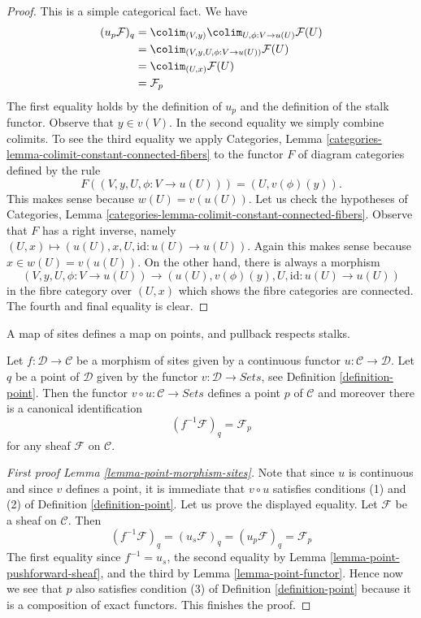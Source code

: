 \begin{proof}
This is a simple categorical fact. We have
\begin{align*}
(u_p\mathcal{F})_q
& =
\colim_{(V, y)} \colim_{U, \phi : V \to u(U)} \mathcal{F}(U) \\
& = \colim_{(V, y, U, \phi : V \to u(U))} \mathcal{F}(U) \\
& = \colim_{(U, x)} \mathcal{F}(U) \\
& = \mathcal{F}_p
\end{align*}
The first equality holds by the definition of $u_p$ and the
definition of the stalk functor. Observe that $y \in v(V)$.
In the second equality we simply combine colimits.
To see the third equality we apply
Categories, Lemma \ref{categories-lemma-colimit-constant-connected-fibers}
to the functor $F$ of diagram categories defined by the rule
$$
F((V, y, U, \phi : V \to u(U))) = (U, v(\phi)(y)).
$$
This makes sense because $w(U) = v(u(U))$. Let us check the hypotheses of
Categories, Lemma \ref{categories-lemma-colimit-constant-connected-fibers}.
Observe that $F$ has a right inverse, namely
$(U, x) \mapsto (u(U), x, U, \text{id} : u(U) \to u(U))$.
Again this makes sense because $x \in w(U) = v(u(U))$. On the other hand,
there is always a morphism
$$
(V, y, U, \phi : V \to u(U))
\longrightarrow
(u(U), v(\phi)(y), U, \text{id} : u(U) \to u(U))
$$
in the fibre category over $(U, x)$ which shows the fibre categories
are connected. The fourth and final equality is clear.
\end{proof}

\begin{lemma}
\label{lemma-point-morphism-sites}
\begin{slogan}
A map of sites defines a map on points, and pullback respects stalks.
\end{slogan}
Let $f : \mathcal{D} \to \mathcal{C}$ be a morphism of sites
given by a continuous functor $u : \mathcal{C} \to \mathcal{D}$.
Let $q$ be a point of $\mathcal{D}$ given by the functor
$v : \mathcal{D} \to \textit{Sets}$, see
Definition \ref{definition-point}.
Then the functor $v \circ u : \mathcal{C} \to \textit{Sets}$
defines a point $p$ of $\mathcal{C}$ and moreover there is
a canonical identification
$$
(f^{-1}\mathcal{F})_q = \mathcal{F}_p
$$
for any sheaf $\mathcal{F}$ on $\mathcal{C}$.
\end{lemma}

\begin{proof}[First proof Lemma \ref{lemma-point-morphism-sites}]
Note that since $u$ is continuous and since $v$ defines a point,
it is immediate that $v \circ u$ satisfies conditions (1) and (2) of
Definition \ref{definition-point}. Let us prove the displayed equality.
Let $\mathcal{F}$ be a sheaf on $\mathcal{C}$. Then
$$
(f^{-1}\mathcal{F})_q = (u_s\mathcal{F})_q =
(u_p \mathcal{F})_q = \mathcal{F}_p
$$
The first equality since $f^{-1} = u_s$, the second equality
by Lemma \ref{lemma-point-pushforward-sheaf}, and the third
by Lemma \ref{lemma-point-functor}.
Hence now we see that $p$ also satisfies condition (3) of
Definition \ref{definition-point}
because it is a composition of exact functors. This finishes the proof.
\end{proof}

